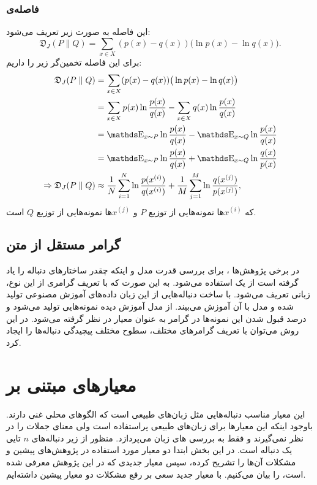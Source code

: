 \subsubsection{فاصله‌ی }
این فاصله به صورت زیر تعریف می‌شود:
\begin{equation}
\mathfrak{D}_{J}( P \parallel Q)=\sum _{{x\in X}} (p(x)-q(x)){\big (}\ln p(x)-\ln q(x){\big )}.
\end{equation}
برای این فاصله تخمین‌گر زیر را داریم:
\begin{equation}
\begin{split}
\mathfrak{D}_{J}( P \parallel Q) &= \sum _{{x\in X}} (p(x)-q(x)){\big (}\ln p(x)-\ln q(x){\big )}\\
 &= \sum _{{x\in X}} p(x) \ln \frac{p(x)}{q(x)}
- \sum _{{x\in X}} q(x) \ln \frac{p(x)}{q(x)}\\
 &= \ME_{x \sim P} \ln \frac{p(x)}{q(x)}
 - \ME_{x \sim Q}\ln \frac{p(x)}{q(x)}\\
  &= \ME_{x \sim P} \ln \frac{p(x)}{q(x)}
  + \ME_{x \sim Q}\ln \frac{q(x)}{p(x)}\\
 \Rightarrow \mathfrak{D}_{J}( P \parallel Q) &\approx  
 \frac{1}{N}\sum_{i=1}^N \ln \frac{p(x^{(i)})}{q(x^{(i)})}
  + \frac{1}{M}\sum_{j=1}^M \ln \frac{q(x^{(j)})}{p(x^{(j)})},
\end{split}
\end{equation}
که 
$x^{(i)}$ها
نمونه‌هایی از توزیع
$P$
و
$x^{(j)}$ها
نمونه‌هایی از توزیع
$Q$
است.
\subsection{گرامر مستقل از متن}\label{Metric:CFG}
در برخی پژوهش‌ها
	\cite{kusner2016gans,subramanian2017adversarial}،
	برای بررسی قدرت مدل و اینکه چقدر ساختار‌های دنباله را یاد گرفته است از یک 
	 استفاده می‌شود.
	به این صورت که با تعریف گرامری از این نوع، زبانی تعریف می‌شود. با ساخت دنباله‌هایی از این زبان داده‌های آموزش مصنوعی تولید شده و مدل با آن آموزش می‌بیند. از مدل آموزش دیده نمونه‌هایی تولید می‌شود و درصد قبول شدن این نمونه‌ها در گرامر به عنوان معیار در نظر گرفته می‌شود. 
	در این روش می‌توان با تعریف گرامر‌های مختلف، سطوح مختلف پیچیدگی دنباله‌ها را ایجاد کرد.
\section{ معیارهای مبتنی بر \ngram}
این معیار مناسب دنباله‌هایی مثل زبان‌های طبیعی است که الگو‌های محلی غنی دارند.
باوجود اینکه این معیارها برای زبان‌های طبیعی پراستفاده است ولی معنای جملات را در نظر نمی‌گیرند و فقط به بررسی
\ngram
های زبان می‌پردازد. منظور از 
\ngram{}
زیر دنباله‌های $n$ تایی یک دنباله است.
\newline
در این بخش ابتدا دو معیار مورد استفاده در پژوهش‌های پیشین و مشکلات آن‌ها را تشریح کرده، سپس معیار جدیدی که در این پژوهش معرفی شده است، را بیان می‌کنیم. با معیار جدید سعی بر رفع مشکلات دو معیار پیشین داشته‌ایم.
